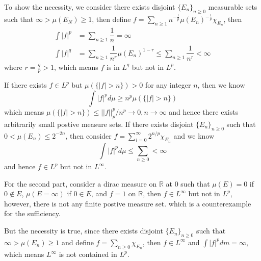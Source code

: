 \documentclass[lang=en,11pt,a4paper,citestyle =authoryear]{elegantpaper}
\newcommand{\R}{\mathbb{R}}
\begin{document}
To show the necessity, we consider there exists disjoint $\{E_n\}_{n\geq 0}$ measurable sets such that $\infty > \mu(E_N) \geq 1$, then define $f = \sum\limits_{n\geq 1} n^{-\tfrac{1}{p}}\mu(E_n)^{-\tfrac{1}{p}}\chi_{E_n}$, then
\[\begin{aligned}
    \int |f|^p &= \sum\limits_{n\geq 1} \dfrac{1}{n} = \infty \\
    \int |f|^q &= \sum\limits_{n\geq 1} \dfrac{1}{n^r}\mu(E_n)^{1-r} \leq \sum\limits_{n\geq 1} \dfrac{1}{n^r} < \infty
\end{aligned}\]
where $r = \tfrac{q}{p} > 1$, which means $f$ is in $L^q$ but not in $L^p$.\par
If there exists $f\in L^p$ but $\mu(\{|f|>n\}) > 0$ for any integer $n$, then we know
\[\int |f|^p d\mu \geq n^p\mu(\{|f|>n\})\]
which means $\mu(\{|f|>n\}) \leq ||f||_p^p/n^p \to 0, n\to\infty$ and hence there exists arbitrarily small postive measure sets. If there exists disjoint $\{E_n\}_{n\geq 0}$ such that $0< \mu(E_n) \leq 2^{-2n}$, then consider $f = \sum\limits_{i=0}^{\infty} 2^{n/p}\chi_{E_n}$ and we know
\[\int |f|^p d\mu \leq \sum\limits_{n\geq 0} <\infty\]
and hence $f\in L^p$ but not in $L^{\infty}$.\par
For the second part, consider a dirac measure on $\R$ at $0$ such that $\mu(E) = 0$ if $0\notin E$, $\mu(E=\infty)$ if $0\in E$, and $f = 1$ on $\R$, then $f\in L^{\infty}$ but not in $L^p$, however, there is not any finite postive measure set. which is a counterexample for the sufficiency.\par
But the necessity is true, since there exists disjoint $\{E_n\}_{n\geq 0}$ such that $\infty > \mu(E_n)\geq 1$ and define $f = \sum\limits_{n\geq 0}\chi_{E_n}$, then $f\in L^{\infty}$ and $\int |f|^p dm = \infty$, which means $L^{\infty}$ is not contained in $L^p$.\par 
\vspace{0.5em}
\end{document}
